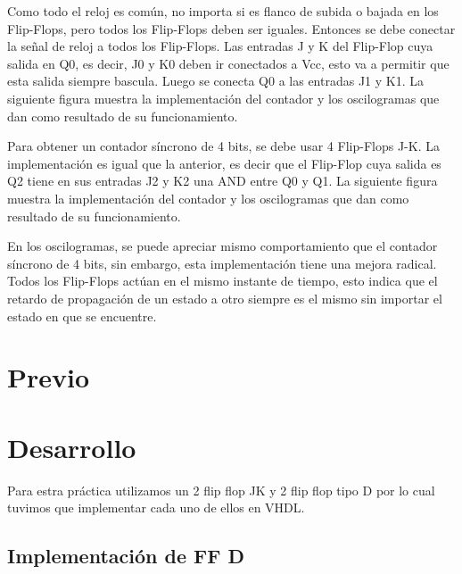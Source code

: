 \documentclass{mylib/reporteConCalif}
\begin{document}
Como todo el reloj es común, no importa si es flanco de subida o bajada en los Flip-Flops, pero todos los Flip-Flops deben ser iguales. Entonces se debe conectar la señal de reloj a todos los Flip-Flops. Las entradas J y K del Flip-Flop cuya salida en Q0, es decir, J0 y K0 deben ir conectados a Vcc, esto va a permitir que esta salida siempre bascula. Luego se conecta Q0 a las entradas J1 y K1. La siguiente figura muestra la implementación del contador y los oscilogramas que dan como resultado de su funcionamiento.

Para obtener un contador síncrono de 4 bits, se debe usar 4 Flip-Flops J-K. La implementación es igual que la anterior, es decir que el Flip-Flop cuya salida es Q2 tiene en sus entradas J2 y K2 una AND entre Q0 y Q1. La siguiente figura muestra la implementación del contador y los oscilogramas que dan como resultado de su funcionamiento.


En los oscilogramas, se puede apreciar mismo comportamiento que el contador síncrono de 4 bits, sin embargo, esta implementación tiene una mejora radical. Todos los Flip-Flops actúan en el mismo instante de tiempo, esto indica que el retardo de propagación de un estado a otro siempre es el mismo sin importar el estado en que se encuentre.

\newpage
\section{Previo}

\newpage
\section{Desarrollo}

Para estra práctica utilizamos un 2 flip flop JK y 2 flip flop tipo D por lo cual tuvimos que implementar cada uno de ellos en VHDL.

\subsection{Implementación de FF D}
\end{document}
